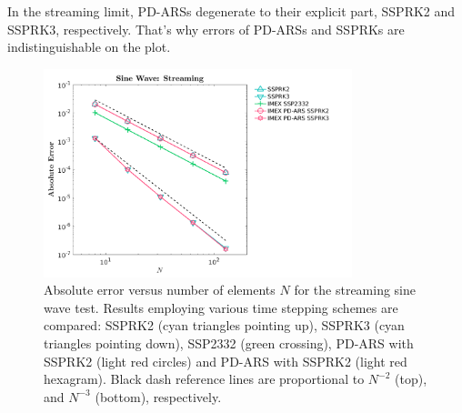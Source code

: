 In the streaming limit, PD-ARSs degenerate to their explicit part, SSPRK2 and SSPRK3, respectively.
That's why errors of PD-ARSs and SSPRKs are indistinguishable on the plot.

\begin{figure}[h]
  \centering
    \includegraphics[width=0.8\textwidth]{figures/SineWaveStreaming}
   \caption{Absolute error versus number of elements $N$ for the streaming sine wave test.  Results employing various time stepping schemes are compared: SSPRK2 (cyan triangles pointing up), SSPRK3 (cyan triangles pointing down), SSP2332 (green crossing), PD-ARS with SSPRK2 (light red circles) and PD-ARS with SSPRK2 (light red hexagram). Black dash reference lines are proportional to $N^{-2}$ (top), and $N^{-3}$ (bottom), respectively.}
   \label{fig: SineWaveStreaming}
\end{figure}

